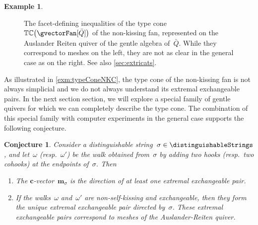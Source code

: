 \documentclass{amsart}
\newtheorem{conjecture}[theorem]{Conjecture}
\theoremstyle{definition}
\newtheorem{example}[theorem]{Example}
\renewcommand{\b}[1]{{\boldsymbol{#1}}} %
\newcommand{\multiplicityVector}{\b{m}} %
\newcommand{\typeCone}{\mathbb{TC}} %
\newcommand{\quiver}{\bar Q} %
\begin{document}
\begin{example}
\begin{figure}[h]
\begin{adjustbox}{center}
    \end{adjustbox}
	\caption{The facet-defining inequalities of the type cone~$\typeCone \big( \gvectorFan[\quiver] \big)$ of the non-kissing fan, represented on the Auslander Reiten quiver of the gentle algebra of~$\quiver$. While they correspond to meshes on the left, they are not as clear in the general case as on the right. See also \cref{sec:extricats}.}
	\label{fig:labelFacetDefiningInequalititiesNKC}
\end{figure}
\end{example}

As illustrated in \cref{exm:typeConeNKC}, the type cone of the non-kissing fan is not always simplicial and we do not always understand its extremal exchangeable pairs.
In the next section section, we will explore a special family of gentle quivers for which we can completely describe the type cone.
The combination of this special family with computer experiments in the general case supports the following conjecture.

\begin{conjecture}
Consider a distinguishable string~$\sigma \in \distinguishableStrings$, and let~$\omega$ (resp.~$\omega'$) be the walk obtained from~$\sigma$ by adding two hooks (resp.~two cohooks) at the endpoints of~$\sigma$. Then
\begin{enumerate}
\item The $\b{c}$-vector~$\multiplicityVector_\sigma$ is the direction of at least one extremal exchangeable pair.
\item If the walks~$\omega$ and~$\omega'$ are non-self-kissing and exchangeable, then they form the unique extremal exchangeable pair directed by~$\sigma$. These extremal exchangeable pairs correspond to meshes of the Auslander-Reiten quiver.
\end{enumerate}
\end{conjecture}
\end{document}
